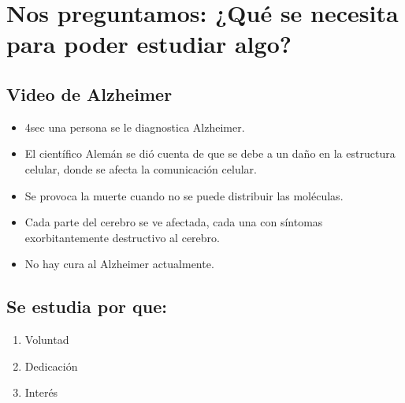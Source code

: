 \section{\textbf{Nos preguntamos:} ¿Qué se necesita para poder estudiar algo?}
\subsection{Video de Alzheimer}
\begin{itemize}
    \item 4sec una persona se le diagnostica Alzheimer.
    \item El científico Alemán se dió cuenta de que se debe a un daño en la estructura celular, donde se afecta la comunicación celular.
    \item Se provoca la muerte cuando no se puede distribuir las moléculas.
    \item Cada parte del cerebro se ve afectada, cada una con síntomas exorbitantemente destructivo al cerebro.
    \item No hay cura al Alzheimer actualmente.
\end{itemize}
\subsection{Se estudia por que:}
\begin{enumerate}
    \item Voluntad 
    \item Dedicación 
    \item Interés
\end{enumerate}

